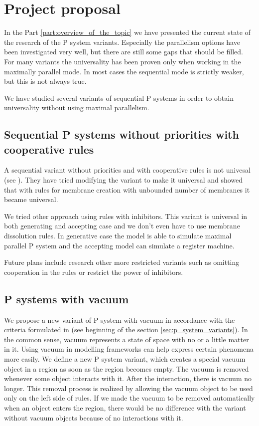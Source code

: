 \chapter{Project proposal} %
\label{cha:project_proposal}

In the Part \ref{part:overview_of_the_topic} we have presented the current state of the research of the P system variants. Especially the parallelism options have been investigated very well, but there are still some gaps that should be filled. For many variants the universality has been proven only when working in the maximally parallel mode. In most cases the sequential mode is strictly weaker, but this is not always true.

We have studied several variants of sequential P systems in order to obtain universality without using maximal parallelism.

\section{Sequential P systems without priorities with cooperative rules} %
\label{sec:sequential_p_systems_without_priorities_with_cooperative_rules}

A sequential variant without priorities and with cooperative rules is not univesal (see \cite{Ibarra04dang}). They have tried modifying the variant to make it universal and showed that with rules for membrane creation with unbounded number of membranes it became universal.

We tried other approach using rules with inhibitors. This variant is universal in both generating and accepting case and we don't even have to use membrane dissolution rules. In generative case the model is able to simulate maximal parallel P system and the accepting model can simulate a register machine.

Future plans include research other more restricted variants such as omitting cooperation in the rules or restrict the power of inhibitors.

\section{P systems with vacuum} %
\label{sec:p_systems_with_vacuum}

We propose a new variant of P system with vacuum in accordance with the criteria formulated in \cite{Besozzi:PhD:2004} (see beginning of the section \ref{sec:p_system_variants}). In the common sense, vacuum represents a state of space with no or a little matter in it. Using vacuum in modelling frameworks can help express certain phenomena more easily. We define a new P system variant, which creates a special vacuum object in a region as soon as the region becomes empty. The vacuum is removed whenever some object interacts with it. After the interaction, there is vacuum no longer. This removal process is realized by allowing the vacuum object to be used only on the left side of rules. If we made the vacuum to be removed automatically when an object enters the region, there would be no difference with the variant without vacuum objects because of no interactions with it.

